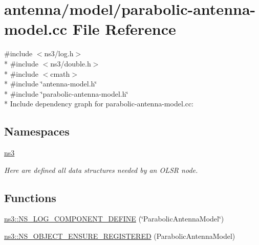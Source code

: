 \hypertarget{parabolic-antenna-model_8cc}{}\section{antenna/model/parabolic-\/antenna-\/model.cc File Reference}
\label{parabolic-antenna-model_8cc}
{\ttfamily \#include $<$ns3/log.\+h$>$}\\*
{\ttfamily \#include $<$ns3/double.\+h$>$}\\*
{\ttfamily \#include $<$cmath$>$}\\*
{\ttfamily \#include \char`\"{}antenna-\/model.\+h\char`\"{}}\\*
{\ttfamily \#include \char`\"{}parabolic-\/antenna-\/model.\+h\char`\"{}}\\*
Include dependency graph for parabolic-\/antenna-\/model.cc\+:
\subsection*{Namespaces}
\begin{DoxyCompactItemize}
\item 
 \hyperlink{namespacens3}{ns3}
\begin{DoxyCompactList}\small\item\em Here are defined all data structures needed by an O\+L\+SR node. \end{DoxyCompactList}\end{DoxyCompactItemize}
\subsection*{Functions}
\begin{DoxyCompactItemize}
\item 
\hyperlink{namespacens3_ad519fa3d08f2075b26058ebe67143f93}{ns3\+::\+N\+S\+\_\+\+L\+O\+G\+\_\+\+C\+O\+M\+P\+O\+N\+E\+N\+T\+\_\+\+D\+E\+F\+I\+NE} (\char`\"{}Parabolic\+Antenna\+Model\char`\"{})
\item 
\hyperlink{namespacens3_aed08ecdf776c4bfae75d96dde6ef66de}{ns3\+::\+N\+S\+\_\+\+O\+B\+J\+E\+C\+T\+\_\+\+E\+N\+S\+U\+R\+E\+\_\+\+R\+E\+G\+I\+S\+T\+E\+R\+ED} (Parabolic\+Antenna\+Model)
\end{DoxyCompactItemize}
